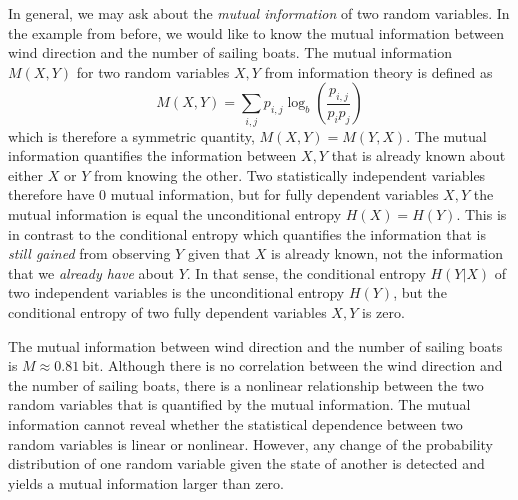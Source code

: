 In general, we may ask about the \emph{mutual information} of two random variables. In the example from before, we would
like to know the mutual information between wind direction and the number of sailing boats. The mutual information
$M(X,Y)$ for two random variables $X,Y$ from information theory is defined as
\begin{equation}
	M(X, Y) = \sum_{i,j} p_{i,j} \log_b \left( \frac{p_{i,j}}{p_ip_j} \right)
	\label{eq:mutual_information}
\end{equation}
which is therefore a symmetric quantity, $M(X,Y) = M(Y,X)$. The mutual information quantifies the information
between $X,Y$ that is already known about either $X$ or $Y$ from knowing the other. Two statistically independent
variables therefore have 0 mutual information, but for fully dependent variables $X,Y$ the mutual information is equal
the unconditional entropy $H(X) = H(Y)$. This is in contrast to the conditional entropy which quantifies the information
that is \emph{still gained} from observing $Y$ given that $X$ is already known, not the information that we
\emph{already have} about $Y$. In that sense, the conditional entropy $H(Y\vert X)$ of two independent variables is
the unconditional entropy $H(Y)$, but the conditional entropy of two fully dependent variables $X,Y$ is zero.

The mutual information between wind direction and the number of sailing boats is $M \approx 0.81~\mathrm{bit}$.
Although there is no correlation between the wind direction and the number of sailing boats, there is a nonlinear
relationship between the two random variables that is quantified by the mutual information. The mutual information
cannot reveal whether the statistical dependence between two random variables is linear or nonlinear. However, any change
of the probability distribution of one random variable given the state of another is detected and yields a mutual information
larger than zero. 

